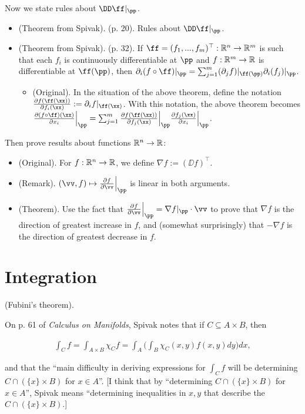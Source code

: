 Now we state rules about $\DD \ff|_\pp$.

\begin{itemize}
    \item (Theorem from Spivak). (p. 20). Rules about $\DD \ff|_\pp$.
    \item (Theorem from Spivak). (p. 32). If $\ff = (f_1, ..., f_m)^\top:\R^n \rightarrow \R^m$ is such that each $f_i$ is continuously differentiable at $\pp$ and $f:\mathbb{R}^m \rightarrow \mathbb{R}$ is differentiable at $\ff(\pp)$, then $\pd_i (f \circ \ff)|_\pp = \sum_{j = 1}^m (\pd_j f)|_{\ff(\pp)} \pd_i (f_j)|_\pp$.
    \begin{itemize}
        \item (Original). In the situation of the above theorem, define the notation $\frac{\pd f(\ff(\xx))}{\pd f_i(\xx)} := \pd_i f|_{\ff(\xx)}$. With this notation, the above theorem becomes $\frac{\pd(f \circ \ff)(\xx)}{\pd x_i}\Big|_\pp = \sum_{j = 1}^m \frac{\pd f(\ff(\xx))}{\pd f_j(\xx)} \Big|_\pp \frac{\pd f_j(\xx)}{\pd x_i}\Big|_\pp$.
    \end{itemize}
\end{itemize}

Then prove results about functions $\mathbb{R}^n \rightarrow \mathbb{R}$:

\begin{itemize}
    \item (Original). For $f:\mathbb{R}^n \rightarrow \mathbb{R}$, we define $\nabla f := (\DD f)^\top$.
    \item (Remark). $(\vv, f) \mapsto \frac{\pd f}{\pd \vv} \Big|_\pp$ is linear in both arguments.
    \item (Theorem). Use the fact that $\frac{\pd f}{\pd \vv}\Big|_\pp = \nabla f|_\pp \cdot \vv$ to prove that $\nabla f$ is the direction of greatest increase in $f$, and (somewhat surprisingly) that $-\nabla f$ is the direction of greatest decrease in $f$.
\end{itemize}

\newpage

\section*{Integration}

\begin{theorem}
    (Fubini's theorem). 

    On p. 61 of \textit{Calculus on Manifolds}, Spivak notes that if $C \subseteq A \times B$, then

    \begin{align*}
        \int_C f = \int_{A \times B} \chi_C f = \int_A \Big( \int_B \chi_C(x, y) f(x, y) dy \Big) dx,
    \end{align*}

    and that the ``main difficulty in deriving expressions for $\int_C f$ will be determining $C \cap (\{x\} \times B)$ for $x \in A$''. [I think that by ``determining $C \cap (\{x\} \times B)$ for $x \in A$'', Spivak means ``determining inequalities in $x, y$ that describe the $C \cap (\{x\} \times B)$.]
\end{theorem}

